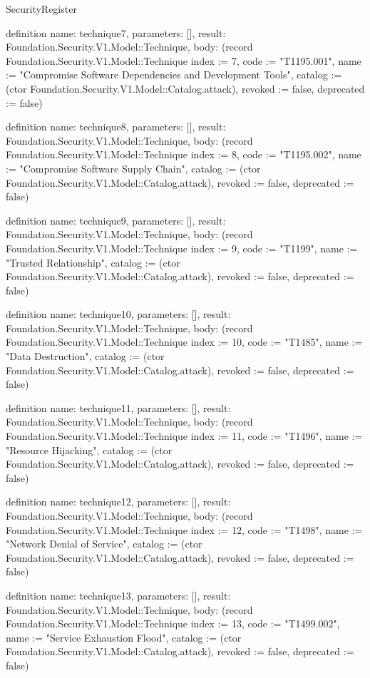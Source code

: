 \begin{lexlean}{SecurityRegister}
\begin{semanticmodule}
definition{
  name: technique7,
  parameters: [],
  result: Foundation.Security.V1.Model::Technique,
  body: (record Foundation.Security.V1.Model::Technique {index := 7, code := "T1195.001", name := "Compromise Software Dependencies and Development Tools", catalog := (ctor Foundation.Security.V1.Model::Catalog.attack), revoked := false, deprecated := false})
}

definition{
  name: technique8,
  parameters: [],
  result: Foundation.Security.V1.Model::Technique,
  body: (record Foundation.Security.V1.Model::Technique {index := 8, code := "T1195.002", name := "Compromise Software Supply Chain", catalog := (ctor Foundation.Security.V1.Model::Catalog.attack), revoked := false, deprecated := false})
}

definition{
  name: technique9,
  parameters: [],
  result: Foundation.Security.V1.Model::Technique,
  body: (record Foundation.Security.V1.Model::Technique {index := 9, code := "T1199", name := "Trusted Relationship", catalog := (ctor Foundation.Security.V1.Model::Catalog.attack), revoked := false, deprecated := false})
}

definition{
  name: technique10,
  parameters: [],
  result: Foundation.Security.V1.Model::Technique,
  body: (record Foundation.Security.V1.Model::Technique {index := 10, code := "T1485", name := "Data Destruction", catalog := (ctor Foundation.Security.V1.Model::Catalog.attack), revoked := false, deprecated := false})
}

definition{
  name: technique11,
  parameters: [],
  result: Foundation.Security.V1.Model::Technique,
  body: (record Foundation.Security.V1.Model::Technique {index := 11, code := "T1496", name := "Resource Hijacking", catalog := (ctor Foundation.Security.V1.Model::Catalog.attack), revoked := false, deprecated := false})
}

definition{
  name: technique12,
  parameters: [],
  result: Foundation.Security.V1.Model::Technique,
  body: (record Foundation.Security.V1.Model::Technique {index := 12, code := "T1498", name := "Network Denial of Service", catalog := (ctor Foundation.Security.V1.Model::Catalog.attack), revoked := false, deprecated := false})
}

definition{
  name: technique13,
  parameters: [],
  result: Foundation.Security.V1.Model::Technique,
  body: (record Foundation.Security.V1.Model::Technique {index := 13, code := "T1499.002", name := "Service Exhaustion Flood", catalog := (ctor Foundation.Security.V1.Model::Catalog.attack), revoked := false, deprecated := false})
}


\end{semanticmodule}
\end{lexlean}
